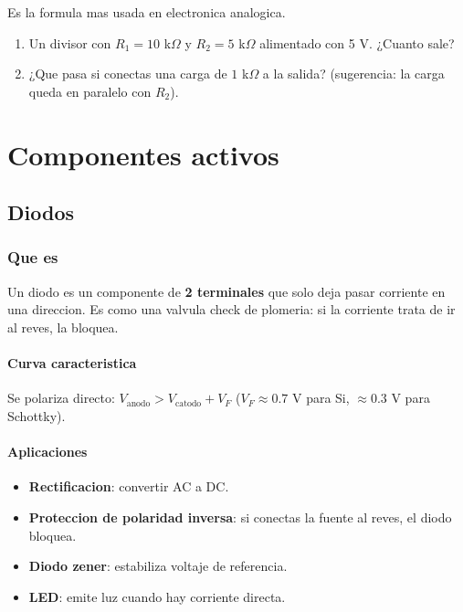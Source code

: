 \documentclass[11pt,a4paper,oneside,openright]{book}
\begin{document}
Es la formula mas usada en electronica analogica.

\begin{ejercicio}
\begin{enumerate}[leftmargin=2em]
  \item Un divisor con $R_1 = 10$ k$\Omega$ y $R_2 = 5$ k$\Omega$ alimentado
        con 5 V. ¿Cuanto sale?
  \item ¿Que pasa si conectas una carga de $1$ k$\Omega$ a la salida?
        (sugerencia: la carga queda en paralelo con $R_2$).
\end{enumerate}
\end{ejercicio}

\part{Componentes activos}

\chapter{Diodos}

\section{Que es}

Un diodo es un componente de \textbf{2 terminales} que solo deja pasar
corriente en una direccion. Es como una valvula check de plomeria: si la
corriente trata de ir al reves, la bloquea.

\subsection{Curva caracteristica}

Se polariza directo: $V_{\text{anodo}} > V_{\text{catodo}} + V_F$
($V_F \approx 0.7$ V para Si, $\approx 0.3$ V para Schottky).

\subsection{Aplicaciones}

\begin{itemize}[leftmargin=2em]
  \item \textbf{Rectificacion}: convertir AC a DC.
  \item \textbf{Proteccion de polaridad inversa}: si conectas la fuente al
        reves, el diodo bloquea.
  \item \textbf{Diodo zener}: estabiliza voltaje de referencia.
  \item \textbf{LED}: emite luz cuando hay corriente directa.
\end{itemize}
\end{document}
